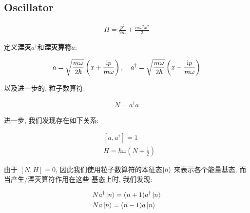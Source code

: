 \subsection{Oscillator}

\begin{equation}
  \begin{aligned}
    H = \frac{p^{2}}{2m} + \frac{m \omega^{2} x^{2}}{2}
  \end{aligned}
\end{equation}

定义{\bf 湮灭}$a^{\dagger}$和{\bf 湮灭算符}$a$:

\begin{equation}
  \begin{aligned}
    a = \sqrt{\frac{m \omega}{2 \hbar}} \left( x + \frac{{\rm i} p}{m \omega} \right),\quad a^{\dagger} = \sqrt{\frac{m \omega}{2 \hbar}} \left( x - \frac{{\rm i} p}{m \omega} \right)
  \end{aligned}
\end{equation}

以及进一步的, 粒子数算符:

\begin{equation}
  \begin{aligned}
    N = a^{\dagger}a
  \end{aligned}
\end{equation}

进一步, 我们发现存在如下关系:

\begin{equation}
  \begin{aligned}
    &[a, a^{\dagger}] = 1 \\
    &H = \hbar \omega \left( N + \frac{1}{2} \right)
  \end{aligned}
\end{equation}

由于 $[N, H]=0$, 因此我们使用粒子数算符的本征态$\ket{n}$ 来表示各个能量基态, 而当产生/湮灭算符作用在这些
基态上时, 我们发现:

\begin{equation}
  \begin{aligned}
    &N a^{\dagger} \ket{n} = (n+1) a^{\dagger} \ket{n}\\
    &N a \ket{n} = (n-1) a \ket{n}
  \end{aligned}
\end{equation}


